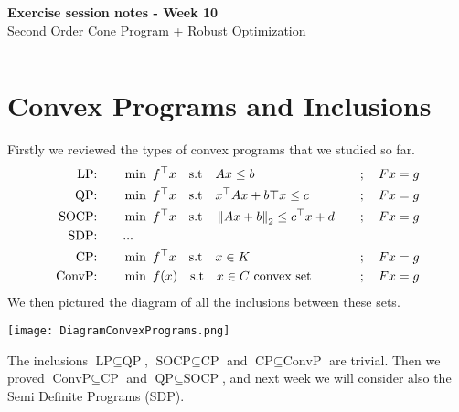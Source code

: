 \documentclass[answers]{exam}
\begin{document}
	$ $
	\begin{center}
		\huge \textbf{Exercise session notes - Week 10}  \\ \vspace*{3mm}
        \Large{Second Order Cone Program + Robust Optimization}
	\end{center}
	$ $\\

    \section{Convex Programs and Inclusions}
    \noindent Firstly we reviewed the types of convex programs that we studied so far.
    \begin{alignat*}{3}
        \text{LP:}\qquad    & \min\ f^\top x \quad \text{s.t}\quad Ax\leq b \quad &&;\quad Fx = g \\
        \text{QP:}\qquad    & \min\  f^\top x \quad \text{s.t}\quad x^\top A x + b\top x\leq c \quad &&;\quad Fx = g  \\
        \text{SOCP:}\qquad  & \min\  f^\top x \quad \text{s.t}\quad \left\lVert Ax + b \right\rVert_2 \leq c^\top x + d \quad &&;\quad Fx = g \\
        \text{SDP:}\qquad   & \text{...} && \\
        \text{CP:}\qquad    & \min\  f^\top x \quad \text{s.t}\quad x\in K \quad &&;\quad Fx = g \\
        \text{ConvP:}\qquad & \min\  f(x) \quad \text{s.t}\quad x\in C\text{ convex set}\quad &&;\quad Fx = g
    \end{alignat*}
    We then pictured the diagram of all the inclusions between these sets.
    \begin{center}
        \texttt{[image: DiagramConvexPrograms.png]}
    \end{center}
    The inclusions $\text{LP}\subseteq \text{QP}$, $\text{SOCP}\subseteq \text{CP}$ and $\text{CP}\subseteq \text{ConvP}$ are trivial. Then we proved $\text{ConvP}\subseteq \text{CP}$ and $\text{QP}\subseteq \text{SOCP}$, and next week we will consider also the Semi Definite Programs (SDP).
\end{document}
